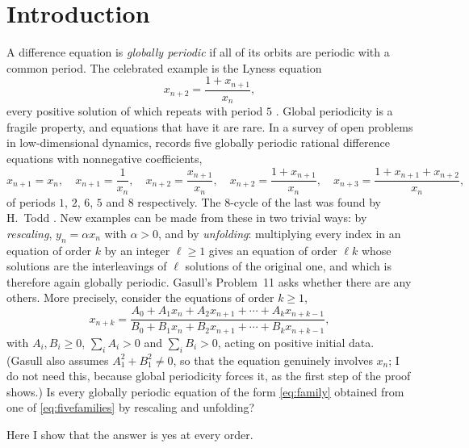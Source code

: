\section{Introduction}
\label{sec:intro}

A difference equation is \emph{globally periodic} if all of its orbits are
periodic with a common period. The celebrated example is the Lyness
equation
\begin{equation}
x_{n+2} = \frac{1+x_{n+1}}{x_n},
\end{equation}
every positive solution of which repeats with period $5$
\citep{Lyness1942}. Global periodicity is a fragile property, and
equations that have it are rare. In a survey of open problems in
low-dimensional dynamics, \citet{Gasull2021} records five globally periodic
rational difference equations with nonnegative coefficients,
\begin{equation}
x_{n+1}=x_n,\quad
x_{n+1}=\frac{1}{x_n},\quad
x_{n+2}=\frac{x_{n+1}}{x_n},\quad
x_{n+2}=\frac{1+x_{n+1}}{x_n},\quad
x_{n+3}=\frac{1+x_{n+1}+x_{n+2}}{x_n},
\label{eq:fivefamilies}
\end{equation}
of periods $1$, $2$, $6$, $5$ and $8$ respectively. The $8$-cycle of the
last was found by H.~Todd \citep{Lyness1945,KocicLadasRodrigues1993}. New examples can be
made from these in two trivial ways: by \emph{rescaling}, $y_n=\alpha x_n$
with $\alpha>0$, and by \emph{unfolding}: multiplying every index in an equation of
order $k$ by an integer $\ell\ge1$ gives an equation of order $\ell k$
whose solutions are the interleavings of $\ell$ solutions of the original
one, and which is therefore again globally periodic. Gasull's Problem~11
asks whether there are any others. More precisely, consider the equations of order
$k\ge1$,
\begin{equation}
x_{n+k}=\frac{A_0+A_1x_n+A_2x_{n+1}+\cdots+A_kx_{n+k-1}}
             {B_0+B_1x_n+B_2x_{n+1}+\cdots+B_kx_{n+k-1}},
\label{eq:family}
\end{equation}
with $A_i,B_i\ge 0$, $\sum_i A_i>0$ and $\sum_i B_i>0$, acting on positive
initial data. (Gasull also assumes $A_1^2+B_1^2\ne0$, so that the equation
genuinely involves $x_n$; I do not need this, because global periodicity
forces it, as the first step of the proof shows.) Is every globally periodic 
equation of the form
\eqref{eq:family} obtained from one of \eqref{eq:fivefamilies} by
rescaling and unfolding?

Here I show that the answer is yes at every order.

